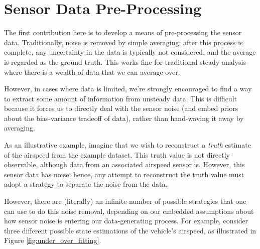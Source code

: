 \documentclass[conf]{new-aiaa}
\begin{document}
    \section{Sensor Data Pre-Processing}

    The first contribution here is to develop a means of pre-processing the sensor data. Traditionally, noise is removed by simple averaging; after this process is complete, any uncertainty in the data is typically not considered, and the average is regarded as the ground truth. This works fine for traditional steady analysis where there is a wealth of data that we can average over.

    However, in cases where data is limited, we're strongly encouraged to find a way to extract some amount of information from unsteady data. This is difficult because it forces us to directly deal with the sensor noise (and embed priors about the bias-variance tradeoff of data), rather than hand-waving it away by averaging.

    As an illustrative example, imagine that we wish to reconstruct a \emph{truth} estimate of the airspeed from the example dataset. This truth value is not directly observable, although data from an associated airspeed sensor is. However, this sensor data has noise; hence, any attempt to reconstruct the truth value must adopt a strategy to separate the noise from the data.

    However, there are (literally) an infinite number of possible strategies that one can use to do this noise removal, depending on our embedded assumptions about how sensor noise is entering our data-generating process. For example, consider three different possible state estimations of the vehicle's airspeed, as illustrated in Figure \ref{fig:under_over_fitting}.
\end{document}
